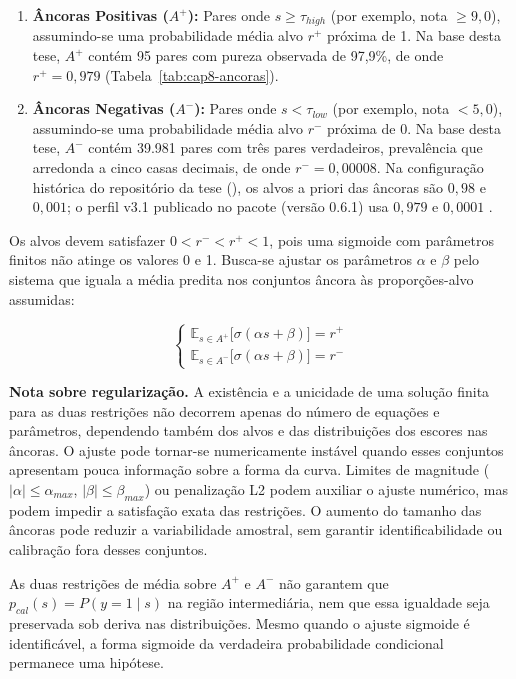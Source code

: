 \begin{enumerate}
\item \textbf{Âncoras Positivas ($A^+$):} Pares onde $s \ge \tau_{high}$ (por exemplo, nota $\ge 9{,}0$), assumindo-se uma probabilidade média alvo $r^+$ próxima de 1. Na base desta tese, $A^+$ contém 95 pares com pureza observada de 97,9\%, de onde $r^+ = 0{,}979$ (Tabela~\ref{tab:cap8-ancoras}).
\item \textbf{Âncoras Negativas ($A^-$):} Pares onde $s < \tau_{low}$ (por exemplo, nota $< 5{,}0$), assumindo-se uma probabilidade média alvo $r^-$ próxima de 0. Na base desta tese, $A^-$ contém 39.981 pares com três pares verdadeiros, prevalência que  arredonda a cinco casas decimais, de onde $r^- = 0{,}00008$. Na configuração histórica do repositório da tese (), os alvos a priori das âncoras são $0{,}98$ e $0{,}001$; o perfil v3.1 publicado no pacote (versão 0.6.1) usa $0{,}979$ e $0{,}0001$ \cite{Jardim2026gzcmd}.
\end{enumerate}

Os alvos devem satisfazer $0<r^-<r^+<1$, pois uma sigmoide com parâmetros finitos não atinge os valores 0 e 1. Busca-se ajustar os parâmetros $\alpha$ e $\beta$ pelo sistema que iguala a média predita nos conjuntos âncora às proporções-alvo assumidas:

\[
\begin{cases}
\mathbb{E}_{s \in A^+}\bigl[\sigma(\alpha s + \beta)\bigr] = r^+ \\
\mathbb{E}_{s \in A^-}\bigl[\sigma(\alpha s + \beta)\bigr] = r^-
\end{cases}
\]

\textbf{Nota sobre regularização.} A existência e a unicidade de uma solução finita para as duas restrições não decorrem apenas do número de equações e parâmetros, dependendo também dos alvos e das distribuições dos escores nas âncoras. O ajuste pode tornar-se numericamente instável quando esses conjuntos apresentam pouca informação sobre a forma da curva. Limites de magnitude ($\lvert\alpha\rvert \le \alpha_{max}$, $\lvert\beta\rvert \le \beta_{max}$) ou penalização L2 podem auxiliar o ajuste numérico, mas podem impedir a satisfação exata das restrições. O aumento do tamanho das âncoras pode reduzir a variabilidade amostral, sem garantir identificabilidade ou calibração fora desses conjuntos.

\begin{proposition}
\label{prop:anchor-contamination-bias}
As duas restrições de média sobre $A^+$ e $A^-$ não garantem que $p_{cal}(s)=P(y=1\mid s)$ na região intermediária, nem que essa igualdade seja preservada sob deriva nas distribuições. Mesmo quando o ajuste sigmoide é identificável, a forma sigmoide da verdadeira probabilidade condicional permanece uma hipótese.
\end{proposition}

